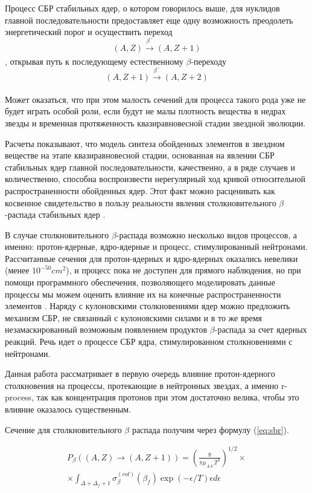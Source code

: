 \documentclass[%
master,    %
natbib,      %
subf,        %
href,        %
colorlinks,  %
]{disser}
\begin{document}
Процесс СБР стабильных ядер, о котором говорилось выше, для нуклидов главной последовательности предоставляет еще одну возможность преодолеть энергетический порог и осуществить переход 
$$(A,Z) \xrightarrow[]{\beta^-} (A,Z + 1)$$
, открывая путь к последующему естественному $\beta$-переходу
$$(A,Z+1) \xrightarrow[]{\beta^-} (A,Z + 2)$$

Может оказаться, что при этом малость сечений для процесса такого рода уже не будет играть особой роли, если будут не малы плотность вещества в недрах звезды и временная протяженность квазиравновесной стадии звездной эволюции.

Расчеты показывают, что модель синтеза обойденных элементов в звездном веществе на этапе квазиравновесной стадии, основанная на явлении СБР стабильных ядер главной последовательности, качественно, а в ряде случаев и количественно, способна воспроизвести нерегулярный ход кривой относительной распространенности обойденных ядер. Этот факт можно расценивать как косвенное свидетельство в пользу реальности явления столкновительного $\beta$-распада стабильных ядер \cite{tak}.

В случае столкновительного $\beta$-распада возможно несколько видов процессов, а именно: протон-ядерные, ядро-ядерные и процесс, стимулированный нейтронами. Рассчитанные сечения для протон-ядерных и ядро-ядерных оказались невелики (менее $10^{-50}cm^2$), и процесс пока не доступен для прямого наблюдения, но при помощи программного обеспечения, позволяющего моделировать данные процессы мы можем оценить влияние их на конечные распространенности элементов \cite{tak_article}. Наряду с кулоновскими столкновениями ядер можно предложить механизм СБР, не связанный с кулоновскими силами и в то же время незамаскированный возможным появлением продуктов $\beta$-распада за счет ядерных реакций. Речь идет о процессе СБР ядра, стимулированном столкновениями с нейтронами.

Данная работа рассматривает в первую очередь влияние протон-ядерного столкновения на процессы, протекающие в нейтронных звездах, а именно r-process, так как концентрация протонов при этом достаточно велика, чтобы это влияние оказалось существенным. 

Сечение для столкновительного $\beta$ распада получим через формулу (\ref{eq:sbr}).

\begin{equation}
\label{eq:sbr}
\begin{split}
P_{\beta}\left((A, Z) \to (A, Z + 1)\right) = \left(\frac{8}{\pi\mu_{A A'} T^3}\right)^{1/2} \times \\
\times \int_{\Delta + \Delta_f + 1}\sigma_\beta^{(col)}(\beta_f)\exp(-\epsilon/T)\epsilon d \epsilon
\end{split}
\end{equation}
\end{document}
